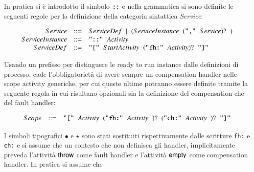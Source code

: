 In pratica si è introdotto il simbolo $\verb#::#$ e nella grammatica si sono
definite le seguenti regole per la definizione della categoria sintattica
\emph{Service}:

$$
\begin{array}{rcl}
Service & ::= &  ServiceDef \hspace{0.2cm} | \hspace{0.2cm} ( ServiceInstance
\hspace{0.2cm}( \verb#","# \hspace{0.2cm} Service  )? \hspace{0.2cm} )  \\ 

ServiceInstance & ::= &  \verb#"::"# \hspace{0.2cm} Activity \\
 
ServiceDef & ::= & \verb#"["# \hspace{0.2cm} StartActivity \hspace{0.2cm} (
\verb#"fh:"# \hspace{0.2cm} Activity )? \hspace{0.2cm} \verb#"]"# \\

\end{array}
$$

Usando un prefisso per distinguere le ready to run instance dalle
definizioni di processo, cade l'obbligatorietà di avere sempre un compensation
handler nelle scope activity generiche, per cui queste ultime potranno essere
definite tramite la seguente regola in cui risultano opzionali sia la
definizione del compensation che del fault handler:

$$
\begin{array}{rcl}
Scope & ::= & \verb#"["# \hspace{0.2cm} Activity \hspace{0.2cm} (
\verb#"fh:"# \hspace{0.2cm} Activity \hspace{0.2cm})? \hspace{0.2cm}(
\verb#"ch:"# \hspace{0.2cm}Activity \hspace{0.2cm})?\hspace{0.2cm} \verb#"]"#
\end{array}
$$

I simboli tipografici $\bullet$ e $\star$ sono stati sostituiti rispettivamente
dalle scritture \verb#fh:# e \verb#ch:# e si assume che un contesto che non
definisca gli handler, implicitamente preveda l'attività ${\sf throw}$ come fault
handler e l'attività ${\sf empty}$ come compensation handler. In pratica si assume
che \label{defHandelr}

